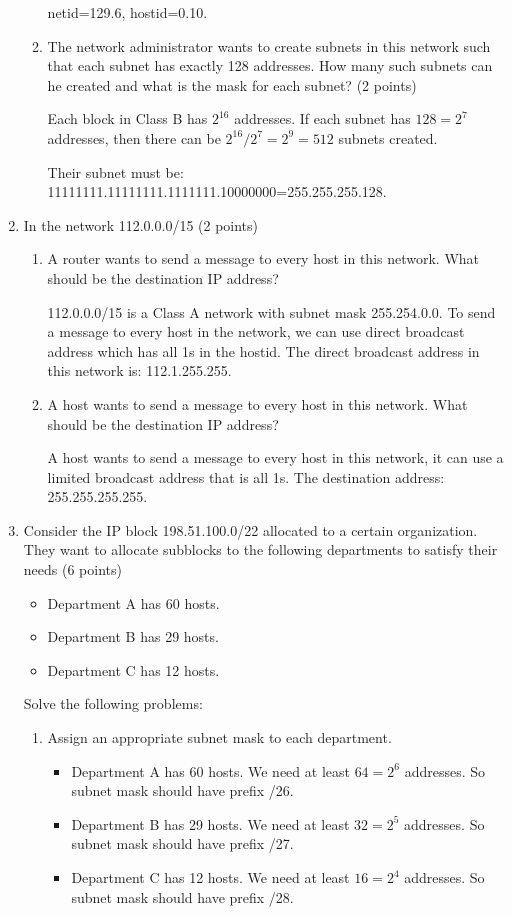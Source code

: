 \documentclass{article}
\begin{document}
\begin{enumerate}
\begin{enumerate}
    netid=129.6, hostid=0.10.
    \item The network administrator wants to create subnets in this network such that each subnet has exactly 128 addresses. How many such subnets can he created and what is the mask for each subnet? (2 points)

    Each block in Class B has $2^{16}$ addresses. If each subnet has $128=2^7$ addresses, then there can be $2^{16}/2^7=2^9=512$ subnets created.

    Their subnet must be: 11111111.11111111.1111111.10000000=255.255.255.128.
  \end{enumerate}
  \item In the network 112.0.0.0/15 (2 points)
  \begin{enumerate}
    \item A router wants to send a message to every host in this network. What should be the destination IP address?

    112.0.0.0/15 is a Class A network with subnet mask 255.254.0.0.
    To send a message to every host in the network, we can use direct broadcast address which has all 1s in the hostid.
    The direct broadcast address in this network is: 112.1.255.255.

    \item A host wants to send a message to every host in this network. What should be the destination IP address?

    A host wants to send a message to every host in this network, it can use a limited broadcast address that is all 1s.
    The destination address: 255.255.255.255.
  \end{enumerate}
  \item Consider the IP block 198.51.100.0/22 allocated to a certain organization. They want to allocate subblocks to the following departments to satisfy their needs (6 points)
  \begin{itemize}
    \item Department A has 60 hosts.
    \item Department B has 29 hosts.
    \item Department C has 12 hosts.
  \end{itemize}
  Solve the following problems:

  \begin{enumerate}
    \item Assign an appropriate subnet mask to each department.
    \begin{itemize}
      \item Department A has 60 hosts. We need at least $64=2^6$ addresses.
      So subnet mask should have prefix /26.
      \item Department B has 29 hosts. We need at least $32=2^5$ addresses.
      So subnet mask should have prefix /27.
      \item Department C has 12 hosts. We need at least $16=2^4$ addresses.
      So subnet mask should have prefix /28.
    \end{itemize}


\end{enumerate}
\end{enumerate}
\end{document}
